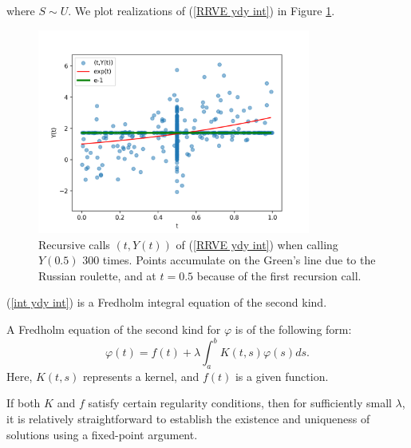 \documentclass[a4paper,12pt]{article}
\begin{document}
\begin{example}[$y_t=y$ average condition]
  where $S \sim U$. We plot realizations of
  (\ref{RRVE ydy int}) in Figure \ref{fig:ydy int}.

  \begin{figure}[h!]
    \centering
    \includegraphics[width=0.8\textwidth]{plots/ydy_int.png}
    \caption{Recursive calls $(t,Y(t))$ of (\ref{RRVE ydy int}) when
      calling $Y(0.5)$ $300$ times. Points accumulate on
      the Green's line due to the Russian roulette,
      and at  $t=0.5$ because of the first recursion call.
    }
    \label{fig:ydy int}
  \end{figure}

\end{example}

(\ref{int ydy int}) is a Fredholm integral
equation of the second kind.

\begin{definition}
  A Fredholm equation of the second kind for $\varphi$  is of the following form:
  \begin{equation}
    \varphi(t)=f(t)+\lambda \int_a^b K(t, s) \varphi(s) ds.
  \end{equation}
  Here, $K(t, s)$ represents a kernel, and $f(t)$ is a given function.
\end{definition}

If both $K$ and $f$ satisfy certain regularity conditions, then for sufficiently
small $\lambda$, it is relatively straightforward to establish the existence
and uniqueness of solutions using a fixed-point argument.
\end{document}
